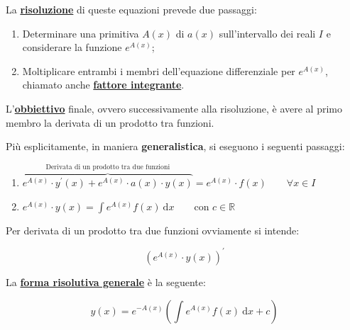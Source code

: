 \documentclass[a4paper]{article}
\begin{document}
	\noindent
	La \textbf{\underline{risoluzione}} di queste equazioni prevede due passaggi:
	
	\begin{enumerate}
		\item Determinare una primitiva $A\left(x\right)$ di $a\left(x\right)$ sull'intervallo dei reali $I$ e considerare la funzione $e^{A\left(x\right)}$;
		
		\item Moltiplicare entrambi i membri dell'equazione differenziale per $e^{A\left(x\right)}$, chiamato anche \textcolor{Red3}{\textbf{\underline{fattore integrante}}}.
	\end{enumerate}

	\noindent
	L'\textcolor{Red3}{\textbf{\underline{obbiettivo}}} finale, ovvero successivamente alla risoluzione, è avere al primo membro la derivata di un prodotto tra funzioni.\newline
	
	\noindent
	Più esplicitamente, in maniera \textbf{generalistica}, si eseguono i seguenti passaggi:
	
	\begin{enumerate}
		\item $\overbrace{e^{A\left(x\right)} \cdot y^{'}\left(x\right) + e^{A\left(x\right)} \cdot a\left(x\right) \cdot y\left(x\right)}^{\text{Derivata di un prodotto tra due funzioni}} = e^{A\left(x\right)} \cdot f\left(x\right) \hspace{2em} \forall x \in I$

		\item $e^{A\left(x\right)} \cdot y\left(x\right) = \int e^{A\left(x\right)} f\left(x\right) \: \mathrm{d}x \hspace{2em} \text{con } c \in \mathbb{R}$
	\end{enumerate}

	\noindent
	Per derivata di un prodotto tra due funzioni ovviamente si intende:
	
	\begin{equation*}
		\left(e^{A\left(x\right)} \cdot y\left(x\right)\right)^{'}
	\end{equation*}

	\noindent
	La \textcolor{Red3}{\textbf{\underline{forma risolutiva generale}}} è la seguente:
	
	\begin{equation*}
		y\left(x\right) = e^{-A\left(x\right)} \left(\int e^{A\left(x\right)} f\left(x\right) \: \mathrm{d}x + c\right)
	\end{equation*}
\end{document}
